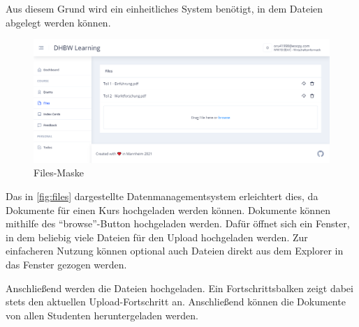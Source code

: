 Aus diesem Grund wird ein einheitliches System benötigt, in dem Dateien abgelegt werden können.

\begin{figure}[h] 
    \centering
    \includegraphics[width=\textwidth]{img/Files.png}
    \caption{Files-Maske}
    \label{fig:files}
\end{figure}

Das in \autoref{fig:files} dargestellte Datenmanagementsystem erleichtert dies, da Dokumente für einen Kurs hochgeladen werden können.
Dokumente können mithilfe des \enquote{browse}-Button hochgeladen werden.
Dafür öffnet sich ein Fenster, in dem beliebig viele Dateien für den Upload hochgeladen werden.
Zur einfacheren Nutzung können optional auch Dateien direkt aus dem Explorer in das Fenster gezogen werden.

Anschließend werden die Dateien hochgeladen.
Ein Fortschrittsbalken zeigt dabei stets den aktuellen Upload-Fortschritt an.
Anschließend können die Dokumente von allen Studenten heruntergeladen werden.











